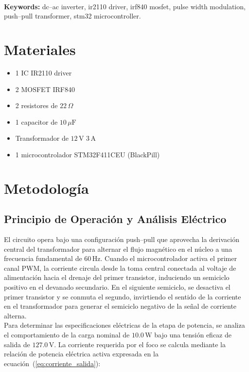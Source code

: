 \documentclass[12pt,a4paper]{article}
\begin{document}
\\

\noindent \textbf{Keywords:} dc--ac inverter, ir2110 driver, irf840 mosfet, pulse width modulation, push--pull transformer, stm32 microcontroller.

\newpage

\section{Materiales}

\begin{itemize}
    \item 1 IC IR2110 driver
    \item 2 MOSFET IRF840
    \item 2 resistores de $22\,\Omega$
    \item 1 capacitor de $10\,\mu\mathrm{F}$
    \item Transformador de $12\,\mathrm{V}$ $3\,\mathrm{A}$
    \item 1 microcontrolador STM32F411CEU (BlackPill)
\end{itemize}

\section{Metodología}

\subsection{Principio de Operación y Análisis Eléctrico}

El circuito opera bajo una configuración push--pull que aprovecha la derivación central del transformador para alternar el flujo magnético en el núcleo a una frecuencia fundamental de $60\,\mathrm{Hz}$. Cuando el microcontrolador activa el primer canal PWM, la corriente circula desde la toma central conectada al voltaje de alimentación hacia el drenaje del primer transistor, induciendo un semiciclo positivo en el devanado secundario. En el siguiente semiciclo, se desactiva el primer transistor y se conmuta el segundo, invirtiendo el sentido de la corriente en el transformador para generar el semiciclo negativo de la señal de corriente alterna. \\

Para determinar las especificaciones eléctricas de la etapa de potencia, se analiza el comportamiento de la carga nominal de $10{.}0\,\mathrm{W}$ bajo una tensión eficaz de salida de $127{.}0\,\mathrm{V}$. La corriente requerida por el foco se calcula mediante la relación de potencia eléctrica activa expresada en la ecuación~(\ref{eq:corriente_salida}):
\end{document}
